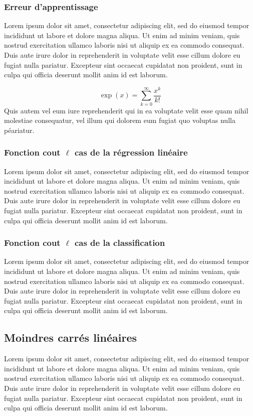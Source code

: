 	\subsubsection{Erreur d'apprentissage}
		Lorem ipsum dolor sit amet, consectetur adipiscing elit, sed do eiusmod tempor incididunt ut labore et dolore magna aliqua. Ut enim ad minim veniam, quis nostrud exercitation ullamco laboris nisi ut aliquip ex ea commodo consequat. Duis aute irure dolor in reprehenderit in voluptate velit esse cillum dolore eu fugiat nulla pariatur. Excepteur sint occaecat cupidatat non proident, sunt in culpa qui officia deserunt mollit anim id est laborum.
	
		\[\exp(x)=\sum_{k=0}^{\infty}\frac{x^k}{k!}\]
		Quis autem vel eum iure reprehenderit qui in ea voluptate velit esse quam nihil molestiae consequatur, vel illum qui dolorem eum fugiat quo voluptas nulla péariatur.
	\subsubsection{Fonction cout $\ell$ cas de la régression linéaire}
		Lorem ipsum dolor sit amet, consectetur adipiscing elit, sed do eiusmod tempor incididunt ut labore et dolore magna aliqua. Ut enim ad minim veniam, quis nostrud exercitation ullamco laboris nisi ut aliquip ex ea commodo consequat. Duis aute irure dolor in reprehenderit in voluptate velit esse cillum dolore eu fugiat nulla pariatur. Excepteur sint occaecat cupidatat non proident, sunt in culpa qui officia deserunt mollit anim id est laborum.
	\subsubsection{Fonction cout $\ell$ cas  de la classification}
		Lorem ipsum dolor sit amet, consectetur adipiscing elit, sed do eiusmod tempor incididunt ut labore et dolore magna aliqua. Ut enim ad minim veniam, quis nostrud exercitation ullamco laboris nisi ut aliquip ex ea commodo consequat. Duis aute irure dolor in reprehenderit in voluptate velit esse cillum dolore eu fugiat nulla pariatur. Excepteur sint occaecat cupidatat non proident, sunt in culpa qui officia deserunt mollit anim id est laborum.
	
	\subsection{Moindres carrés linéaires}
		Lorem ipsum dolor sit amet, consectetur adipiscing elit, sed do eiusmod tempor incididunt ut labore et dolore magna aliqua. Ut enim ad minim veniam, quis nostrud exercitation ullamco laboris nisi ut aliquip ex ea commodo consequat. Duis aute irure dolor in reprehenderit in voluptate velit esse cillum dolore eu fugiat nulla pariatur. Excepteur sint occaecat cupidatat non proident, sunt in culpa qui officia deserunt mollit anim id est laborum. %
	
